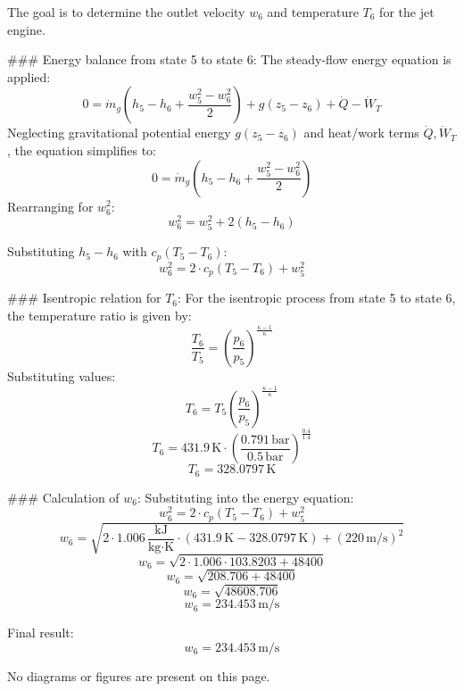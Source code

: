 The goal is to determine the outlet velocity \( w_6 \) and temperature \( T_6 \) for the jet engine.  

### Energy balance from state 5 to state 6:  
The steady-flow energy equation is applied:  
\[
0 = \dot{m}_g \left( h_5 - h_6 + \frac{w_5^2 - w_6^2}{2} \right) + g(z_5 - z_6) + \dot{Q} - \dot{W}_T
\]  
Neglecting gravitational potential energy \( g(z_5 - z_6) \) and heat/work terms \( \dot{Q}, \dot{W}_T \), the equation simplifies to:  
\[
0 = \dot{m}_g \left( h_5 - h_6 + \frac{w_5^2 - w_6^2}{2} \right)
\]  
Rearranging for \( w_6^2 \):  
\[
w_6^2 = w_5^2 + 2(h_5 - h_6)
\]  

Substituting \( h_5 - h_6 \) with \( c_p(T_5 - T_6) \):  
\[
w_6^2 = 2 \cdot c_p(T_5 - T_6) + w_5^2
\]  

### Isentropic relation for \( T_6 \):  
For the isentropic process from state 5 to state 6, the temperature ratio is given by:  
\[
\frac{T_6}{T_5} = \left( \frac{p_6}{p_5} \right)^{\frac{\kappa - 1}{\kappa}}
\]  
Substituting values:  
\[
T_6 = T_5 \left( \frac{p_6}{p_5} \right)^{\frac{\kappa - 1}{\kappa}}
\]  
\[
T_6 = 431.9 \, \text{K} \cdot \left( \frac{0.791 \, \text{bar}}{0.5 \, \text{bar}} \right)^{\frac{0.4}{1.4}}
\]  
\[
T_6 = 328.0797 \, \text{K}
\]  

### Calculation of \( w_6 \):  
Substituting into the energy equation:  
\[
w_6^2 = 2 \cdot c_p(T_5 - T_6) + w_5^2
\]  
\[
w_6 = \sqrt{2 \cdot 1.006 \, \frac{\text{kJ}}{\text{kg·K}} \cdot (431.9 \, \text{K} - 328.0797 \, \text{K}) + (220 \, \text{m/s})^2}
\]  
\[
w_6 = \sqrt{2 \cdot 1.006 \cdot 103.8203 + 48400}
\]  
\[
w_6 = \sqrt{208.706 + 48400}
\]  
\[
w_6 = \sqrt{48608.706}
\]  
\[
w_6 = 234.453 \, \text{m/s}
\]  

Final result:  
\[
w_6 = 234.453 \, \text{m/s}
\]  

No diagrams or figures are present on this page.